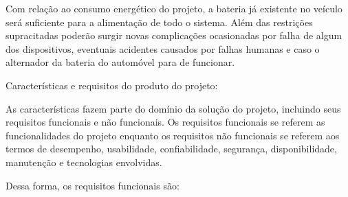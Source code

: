 Com relação ao consumo energético do projeto, a bateria já existente no veículo será suficiente para a alimentação de todo o sistema. Além das restrições supracitadas poderão surgir novas complicações ocasionadas por falha de algum dos dispositivos, eventuais acidentes causados por falhas humanas e caso o alternador da bateria do automóvel para de funcionar.

Características e requisitos do produto do projeto:

As características fazem parte do domínio da solução do projeto, incluindo seus requisitos funcionais e não funcionais. Os requisitos funcionais se referem as funcionalidades do projeto enquanto os requisitos não funcionais se referem aos termos de desempenho, usabilidade, confiabilidade, segurança, disponibilidade, manutenção e tecnologias envolvidas.

Dessa forma, os requisitos funcionais são:

